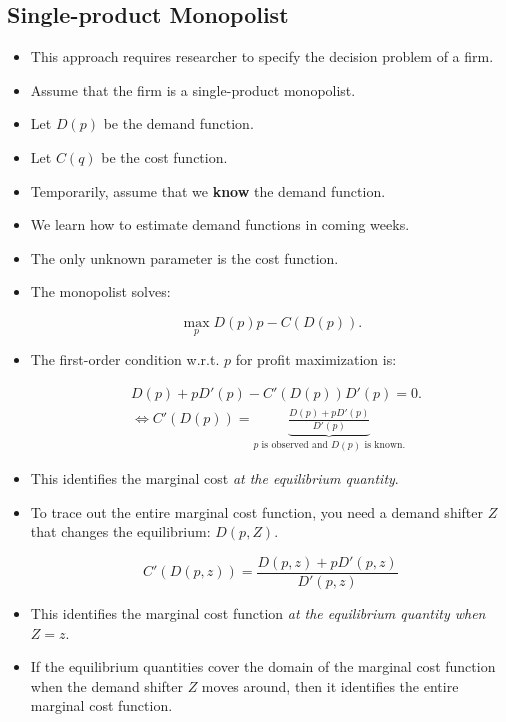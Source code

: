 \documentclass[]{book}
\theoremstyle{definition}
\theoremstyle{definition}
\theoremstyle{definition}
\theoremstyle{remark}
\begin{document}
\subsection{Single-product Monopolist}\label{single-product-monopolist}

\begin{itemize}
\item
  This approach requires researcher to specify the decision problem of a
  firm.
\item
  Assume that the firm is a single-product monopolist.
\item
  Let \(D(p)\) be the demand function.
\item
  Let \(C(q)\) be the cost function.
\item
  Temporarily, assume that we \textbf{know} the demand function.
\item
  We learn how to estimate demand functions in coming weeks.
\item
  The only unknown parameter is the cost function.
\item
  The monopolist solves:

  \begin{equation}
  \max_{p} D(p)p - C(D(p)).
  \end{equation}
\item
  The first-order condition w.r.t. \(p\) for profit maximization is:

  \begin{equation}
  \begin{split}
  &D(p) + pD'(p) - C'(D(p)) D'(p) = 0.\\
  &\Leftrightarrow C'(D(p)) = \underbrace{\frac{D(p) + pD'(p)}{D'(p)}}_{\text{$p$ is observed and $D(p)$ is known.}}
  \end{split}
  \end{equation}
\item
  This identifies the marginal cost
  \textit{at the equilibrium quantity}.
\item
  To trace out the entire marginal cost function, you need a demand
  shifter \(Z\) that changes the equilibrium: \(D(p, Z)\).

  \begin{equation}
  C'(D(p, z)) = \frac{D(p, z) + pD'(p, z)}{D'(p, z)}
  \end{equation}
\item
  This identifies the marginal cost function
  \textit{at the equilibrium quantity when $Z = z$}.
\item
  If the equilibrium quantities cover the domain of the marginal cost
  function when the demand shifter \(Z\) moves around, then it
  identifies the entire marginal cost function.
\end{itemize}
\end{document}
